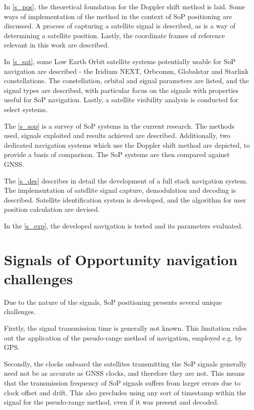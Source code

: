 In \autoref{s_pos}, the theoretical foundation for the Doppler shift method is laid. Some ways of implementation of the method in the context of SoP positioning are discussed. A process of capturing a satellite signal is described, as is a way of determining a satellite position. Lastly, the coordinate frames of reference relevant in this work are described.

In \autoref{s_sat}, some Low Earth Orbit satellite systems potentially usable for SoP navigation are described - the Iridium NEXT, Orbcomm, Globalstar and Starlink constellations. The constellation, orbital and signal parameters are listed, and the signal types are described, with particular focus on the signals with properties useful for SoP navigation. Lastly, a satellite visibility analysis is conducted for select systems.

The \autoref{s_sop} is a survey of SoP systems in the current research. The methods used, signals exploited and results achieved are described. Additionally, two dedicated navigation systems which use the Doppler shift method are depicted, to provide a basis of comparison. The SoP systems are then compared against GNSS.

The \autoref{s_des} describes in detail the development of a full stack navigation system. The implementation of satellite signal capture, demodulation and decoding is described. Satellite identification system is developed, and the algorithm for user position calculation are devised.

In the \autoref{s_exp}, the developed navigation is tested and its parameters evaluated.

\section{Signals of Opportunity navigation challenges}
Due to the nature of the signals, SoP positioning presents several unique challenges.

Firstly, the signal transmission time is generally not known. This limitation rules out the application of the pseudo-range method of navigation, employed e.g. by GPS.

Secondly, the clocks onboard the satellites transmitting the SoP signals generally need not be as accurate as GNSS clocks, and therefore they are not. This means that the transmission frequency of SoP signals suffers from larger errors due to clock offset and drift. This also precludes using any sort of timestamp within the signal for the pseudo-range method, even if it was present and decoded.

